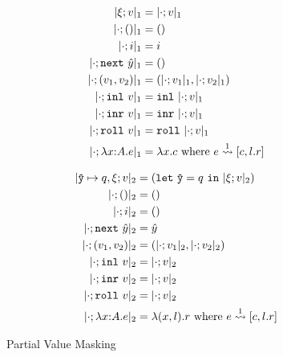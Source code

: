 %

\begin{figure*}
\centering
\begin{minipage}[]{10em}
\begin{align*}
\masko {\xi;v}				&= \masko{\cdot;v} \\
\masko {\cdot;()}			&= () \\
\masko {\cdot;i}			&= i \\
\masko {\cdot;\next~\hat y}	&= () \\
\masko {\cdot;(v_1,v_2)}	&= (\masko {\cdot;v_1},\masko {\cdot;v_2}) \\
\masko {\cdot;\inl~v}		&= \inl~\masko{\cdot;v} \\
\masko {\cdot;\inr~v}		&= \inr~\masko{\cdot;v} \\
\masko {\cdot;\roll~v}		&= \roll~\masko{\cdot;v} \\
\masko {\cdot;\lam xAe}		&= \lambda x.c \text{ where } \splitone e A {c,l.r}
\end{align*}
\end{minipage}
\qquad\qquad
\begin{minipage}[]{10em}
\begin{align*}
\maskt {\yhat \mapsto q,\xi;v}			&= (\letin \yhat q {\maskt{\xi;v}}) \\
\maskt {\cdot;()}			&= () \\
\maskt {\cdot;i}			&= () \\
\maskt {\cdot;\next~\hat y}	&= \hat y \\
\maskt {\cdot;(v_1,v_2)}	&= (\maskt {\cdot;v_1},\maskt {\cdot;v_2}) \\
\maskt {\cdot;\inl~v}		&= \maskt {\cdot;v} \\
\maskt {\cdot;\inr~v}		&= \maskt {\cdot;v} \\
\maskt {\cdot;\roll~v}		&= \maskt {\cdot;v} \\
\maskt {\cdot;\lam xAe}		&= \lambda (x,l).r \text{ where } \splitone e A {c,l.r}
\end{align*}
\end{minipage}
\caption{Partial Value Masking}
\label{fig:valMask}
\end{figure*}

